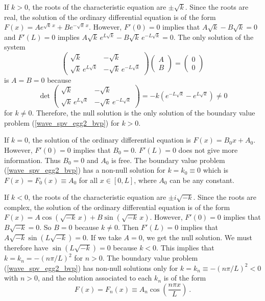 \begin{egg}
If $k>0$, the roots of the characteristic equation are $\pm \sqrt{k}$.
Since the roots are real, the solution of the ordinary differential
equation is of the form
$\displaystyle F(x) = A e^{\sqrt{k}\,x} + B e^{-\sqrt{k}\, x}$.
However, $F'(0)=0$ implies that $A\sqrt{k} - B\sqrt{k}=0$ and
$F'(L)=0$ implies
$\displaystyle A \sqrt{k}\, e^{L\sqrt{k}} - B \sqrt{k}\, e^{-L\sqrt{k}} = 0$.
The only solution of the system
\[
\begin{pmatrix}
\sqrt{k} & -\sqrt{k} \\ \sqrt{k}\, e^{L\sqrt{k}} & -\sqrt{k}\, e^{-L\sqrt{k}}
\end{pmatrix}
\begin{pmatrix}
A \\ B
\end{pmatrix}
=
\begin{pmatrix}
0 \\ 0
\end{pmatrix}
\]
is $A=B=0$ because
\[
\det
\begin{pmatrix}
\sqrt{k} & -\sqrt{k} \\ \sqrt{k}\, e^{L\sqrt{k}} & -\sqrt{k}\, e^{-L\sqrt{k}}
\end{pmatrix}
= -k \left( e^{-L\sqrt{k}} - e^{L\sqrt{k}}\right) \neq 0
\]
for $k\neq 0$.  Therefore, the null solution is the only solution
of the boundary value problem (\ref{wave_spv_egg2_bvp}) for $k>0$.

If $k=0$, the solution of the ordinary differential equation is
$F(x)=B_0 x+ A_0$.  However, $F'(0)=0$ implies that $B_0=0$.
$F'(L)=0$ does not give more information.  Thus $B_0=0$ and $A_0$ is
free.  The boundary value problem
(\ref{wave_spv_egg2_bvp}) has a non-null solution for $k=k_0 \equiv 0$
which is $F(x) = F_0(x) \equiv A_0$ for all $x\in [0,L]$, where $A_0$ can
be any constant.

If $k<0$, the roots of the characteristic equation are $\pm i \sqrt{-k}$.
Since the roots are complex, the solution of the ordinary differential
equation is of the form $\displaystyle
F(x) = A \cos\left(\sqrt{-k}\,x\right) + B \sin\left(\sqrt{-k}\,x\right)$.
However, $F'(0)=0$ implies that $B \sqrt{-k} =0$.  So $B=0$ because
$k\neq 0$.  Then $F'(L)=0$ implies that
$A \sqrt{-k} \sin\left(L\sqrt{-k}\right) = 0$.  If we take
$A=0$, we get the null solution.  We must therefore have
$\sin\left(L\sqrt{-k}\right) = 0$ because $k< 0$.  This implies
that $\displaystyle k = k_n = -\left(n\pi/L\right)^2$ for $n>0$.  The
boundary value problem (\ref{wave_spv_egg2_bvp}) has non-null
solutions only for
$\displaystyle k=k_n\equiv -\left(n\pi/L\right)^2<0$ with $n>0$, and
the solution associated to each $k_n$ is of the form
\[
F(x)=F_n(x) \equiv A_n \cos\left(\frac{n\pi x}{L}\right) \ .
\]


\end{egg}
